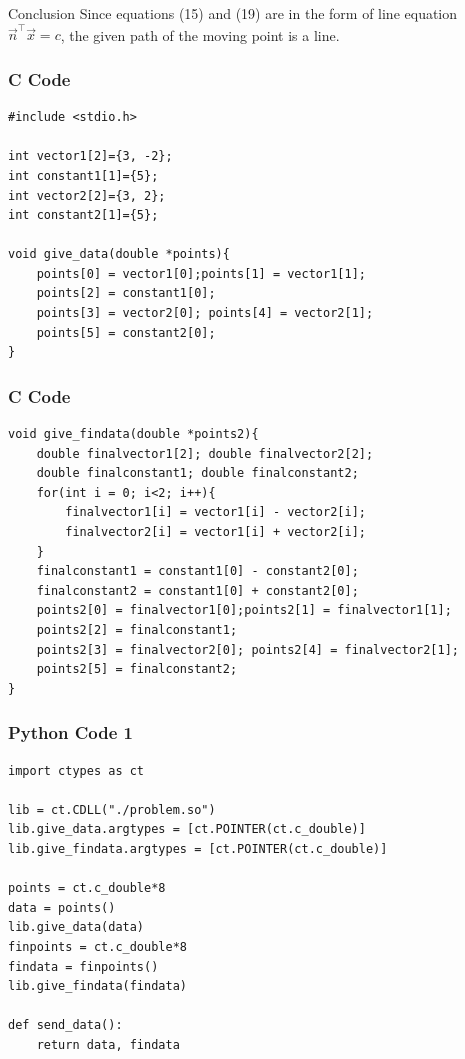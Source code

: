 \documentclass{beamer}
\begin{document}
\begin{frame}{Conclusion}
Since equations (15) and (19) are in the form of line equation $\vec{n}^\top\vec{x}=c$, the given path of the moving point is a line.
\end{frame}


\begin{frame}[fragile]
    \frametitle{C Code}
    \begin{lstlisting}
#include <stdio.h>

int vector1[2]={3, -2};
int constant1[1]={5};
int vector2[2]={3, 2};
int constant2[1]={5};

void give_data(double *points){
    points[0] = vector1[0];points[1] = vector1[1];
    points[2] = constant1[0];
    points[3] = vector2[0]; points[4] = vector2[1];
    points[5] = constant2[0];
}
    \end{lstlisting}
\end{frame}

\begin{frame}[fragile]
    \frametitle{C Code}
    \begin{lstlisting}
void give_findata(double *points2){ 
    double finalvector1[2]; double finalvector2[2]; 
    double finalconstant1; double finalconstant2;
    for(int i = 0; i<2; i++){
        finalvector1[i] = vector1[i] - vector2[i];
        finalvector2[i] = vector1[i] + vector2[i];
    }  
    finalconstant1 = constant1[0] - constant2[0];
    finalconstant2 = constant1[0] + constant2[0];
    points2[0] = finalvector1[0];points2[1] = finalvector1[1];
    points2[2] = finalconstant1;
    points2[3] = finalvector2[0]; points2[4] = finalvector2[1];
    points2[5] = finalconstant2;
}
    \end{lstlisting}
\end{frame}

\begin{frame}[fragile]
    \frametitle{Python Code 1}
    \begin{lstlisting}
import ctypes as ct

lib = ct.CDLL("./problem.so")
lib.give_data.argtypes = [ct.POINTER(ct.c_double)]
lib.give_findata.argtypes = [ct.POINTER(ct.c_double)]

points = ct.c_double*8
data = points()
lib.give_data(data)
finpoints = ct.c_double*8
findata = finpoints()
lib.give_findata(findata)

def send_data():
    return data, findata 
    \end{lstlisting}
\end{frame}
\end{document}
